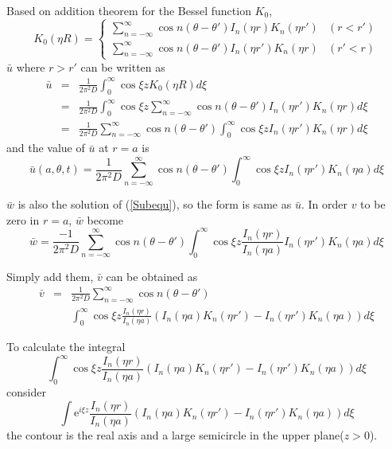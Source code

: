 \documentclass{article}
\begin{document}
Based on addition theorem for the Bessel function $K_0$,
\[
    K_0(\eta R)
    = \begin{cases}
        \sum_{n = -\infty}^\infty \cos n(\theta - \theta')I_n(\eta r)K_n(\eta r') & (r  < r') \\
        \sum_{n = -\infty}^\infty \cos n(\theta - \theta')I_n(\eta r')K_n(\eta r) & (r' < r )
      \end{cases}
\]
$\bar{u}$ where $r > r'$ can be written as
\begin{eqnarray}
    \bar{u} &=& \frac{1}{2\pi^2D}\int^{\infty}_{0}
                \cos{\xi z}K_0(\eta R)d\xi \nonumber \\
            &=& \frac{1}{2\pi^2D}\int^{\infty}_{0}
                \cos{\xi z}\sum_{n = -\infty}^\infty
                \cos n(\theta - \theta')I_n(\eta r')K_n(\eta r)d\xi\nonumber \\
            &=& \frac{1}{2\pi^2D}\sum_{n = -\infty}^\infty
                \cos n(\theta - \theta')\int^{\infty}_{0}
                \cos{\xi z}I_n(\eta r')K_n(\eta r)d\xi
\end{eqnarray}
and the value of $\bar{u}$ at $r = a$ is
\begin{equation}
    \bar{u}(a, \theta, t)
    = \frac{1}{2\pi^2D}\sum_{n = -\infty}^\infty
      \cos n(\theta - \theta')\int^{\infty}_{0}
      \cos{\xi z}I_n(\eta r')K_n(\eta a)d\xi
\end{equation}

$\bar{w}$ is also the solution of (\ref{Subequ}), so the form is same as $\bar{u}$.
In order $v$ to be zero in $r = a$, $\bar{w}$ become
\begin{equation}
    \bar{w} = \frac{-1}{2\pi^2D}\sum_{n = -\infty}^\infty
              \cos n(\theta - \theta')\int^{\infty}_{0}
              \cos{\xi z}\frac{I_n(\eta r)}{I_n(\eta a)}I_n(\eta r')K_n(\eta a)d\xi
\end{equation}

Simply add them, $\bar{v}$ can be obtained as
\begin{eqnarray}
    \bar{v} &=& \frac{1}{2\pi^2D}\sum_{n = -\infty}^\infty
                \cos n(\theta - \theta') \nonumber \\
            & & \int^{\infty}_{0}
                \cos{\xi z}\frac{I_n(\eta r)}{I_n(\eta a)}
                \left(I_n(\eta a)K_n(\eta r') - I_n(\eta r')K_n(\eta a)\right)d\xi
\end{eqnarray}

To calculate the integral
\begin{equation}
    \int^{\infty}_{0}
    \cos{\xi z}\frac{I_n(\eta r)}{I_n(\eta a)}
    \left(I_n(\eta a)K_n(\eta r') - I_n(\eta r')K_n(\eta a)\right)d\xi
\end{equation}
consider
\begin{equation}
    \int
    \mathrm{e}^{i\xi z}\frac{I_n(\eta r)}{I_n(\eta a)}
    \left(I_n(\eta a)K_n(\eta r') - I_n(\eta r')K_n(\eta a)\right)d\xi
\end{equation}
the contour is the real axis and a large semicircle in the upper plane($z > 0$).
\end{document}
